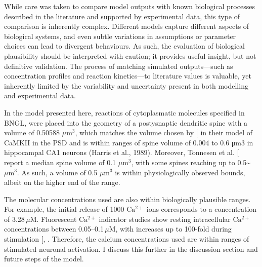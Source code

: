 \documentclass[
  11pt,
  letterpaper,
]{scrreprt}
\begin{document}
While care was taken to compare model outputs with known biological
processes described in the literature and supported by experimental
data, this type of comparison is inherently complex. Different models
capture different aspects of biological systems, and even subtle
variations in assumptions or parameter choices can lead to divergent
behaviours. As such, the evaluation of biological plausibility should be
interpreted with caution; it provides useful insight, but not definitive
validation. The process of matching simulated outputs---such as
concentration profiles and reaction kinetics---to literature values is
valuable, yet inherently limited by the variability and uncertainty
present in both modelling and experimental data.

In the model presented here, reactions of cytoplasmatic molecules
specified in BNGL, were placed into the geometry of a postysnaptic
dendritic spine with a volume of 0.50588 \(\mu\text{m}^3\), which
matches the volume chosen by
{[}\citeproc{ref-ordyan2020Interactions}{435}{]} in their model of
CaMKII in the PSD and is within ranges of spine volume of 0.004 to 0.6
μm3 in hippocampal CA1 neurons (Harris et al., 1989). Moreover, Tonnesen
et al. {[}\citeproc{ref-tonnesen2018SuperResolution}{439}{]} report a
median spine volume of 0.1 \(\mu\text{m}^3\), with some spines reaching
up to 0.5\textasciitilde{}\(\mu\text{m}^3\). As such, a volume of 0.5
\(\mu\text{m}^3\) is within physiologically observed bounds, albeit on
the higher end of the range.

The molecular concentrations used are also within biologically plausible
ranges. For example, the initial release of 1000 \(\mathrm{Ca^{2+}}\)
ions corresponds to a concentration of 3.28\,\(\mu\text{M}\).
Fluorescent \(\mathrm{Ca^{2+}}\) indicator studies show resting
intracellular \(\mathrm{Ca^{2+}}\) concentrations between
0.05--0.1\,\(\mu\text{M}\), with increases up to 100-fold during
stimulation {[},
\citeproc{ref-zheng2018Monitoring}{441}{]}. Therefore, the calcium
concentrations used are within ranges of stimulated neuronal activation.
I discuss this further in the discussion section and future steps of the
model.
\end{document}
